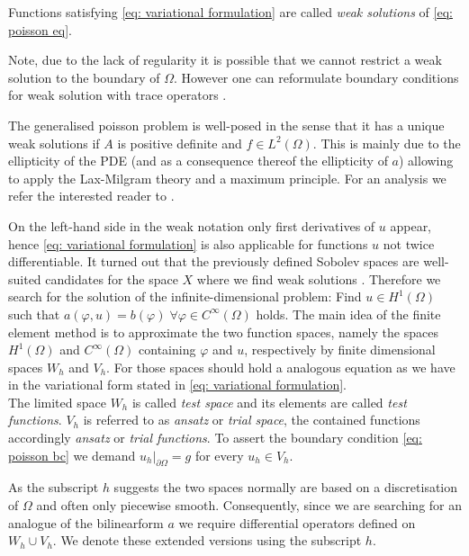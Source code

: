 \begin{definition}
	Functions satisfying \eqref{eq: variational formulation} are called \emph{weak solutions} of \eqref{eq: poisson eq}.
\end{definition}
Note, due to the lack of regularity it is possible that we cannot restrict a weak solution to the boundary of $\Omega$. However one can reformulate boundary conditions for weak solution with trace operators \cite[Section 5.5]{Evans1998}.

The generalised poisson problem is well-posed in the sense that it has a unique weak solutions if $A$ is positive definite and $f\in L^2(\Omega)$. This is mainly due to the ellipticity of the PDE (and as a consequence thereof the ellipticity of $a$) allowing to apply the Lax-Milgram theory and a maximum principle. For an analysis we refer the interested reader to \cite[Chapter~6]{Evans1998}.

On the left-hand side in the weak notation only first derivatives of $u$ appear, hence \eqref{eq: variational formulation} is also applicable for functions $u$ not twice differentiable. It turned out that the previously defined Sobolev spaces are well-suited candidates for the space $X$ where we find weak solutions \cite[Chapter 1]{BS2002}. Therefore we search for the solution of the infinite-dimensional problem: Find $u\in H^1(\Omega)$ such that  $a(\varphi,u)  = b(\varphi) \;\forall \varphi \in C^\infty(\Omega)$ holds. %
The main idea of the finite element method is to approximate the two function spaces, namely the spaces $H^1(\Omega)$ and $C^\infty(\Omega)$ containing $\varphi$ and $u$, respectively by finite dimensional spaces $W_h$ and $V_h$. For those spaces should hold a analogous equation as we have in the variational form stated in \eqref{eq: variational formulation}.\\
The limited space $W_h$ is called \emph{test space} and its elements are called \emph{test functions}. $V_h$ is referred to as \emph{ansatz} or \emph{trial space}, the contained functions accordingly \emph{ansatz} or \emph{trial functions}. To assert the boundary condition \eqref{eq: poisson bc} we demand $u_h|_{\partial \Omega} = g$ for every $u_h \in V_h$.

As the subscript $h$ suggests the two spaces normally are based on a discretisation of $\Omega$ and often only piecewise smooth. Consequently, since we are searching for an analogue of the bilinearform $a$ we require differential operators defined on $W_h \cup V_h$. We denote these extended versions using the subscript $h$.

